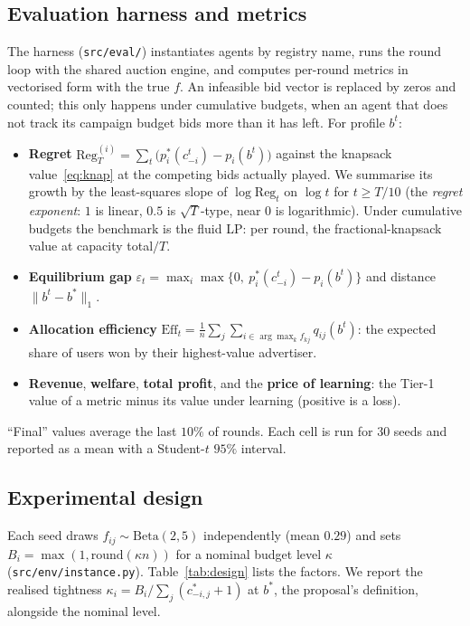 \documentclass{article}
\theoremstyle{definition}
\newcommand{\Reg}{\mathrm{Reg}}
\newcommand{\Eff}{\mathrm{Eff}}
\begin{document}
\subsection{Evaluation harness and metrics}\label{sec:harness}
The harness (\texttt{src/eval/}) instantiates agents by registry name, runs the round loop with the shared
auction engine, and computes per-round metrics in vectorised form with the true $f$. An infeasible bid
vector is replaced by zeros and counted; this only happens under cumulative budgets, when an agent that
does not track its campaign budget bids more than it has left. For profile $b^t$:
\begin{itemize}
  \item \textbf{Regret} $\Reg^{(i)}_T=\sum_t\big(p_i^\ast(c^t_{-i})-p_i(b^t)\big)$ against the
        knapsack value~\eqref{eq:knap} at the competing bids actually played. We summarise its growth by
        the least-squares slope of $\log\Reg_t$ on $\log t$ for $t\ge T/10$ (the \emph{regret exponent}:
        $1$ is linear, $0.5$ is $\sqrt T$-type, near $0$ is logarithmic). Under cumulative budgets the
        benchmark is the fluid LP: per round, the fractional-knapsack value at capacity total$/T$.
  \item \textbf{Equilibrium gap} $\varepsilon_t=\max_i\max\{0,\ p_i^\ast(c^t_{-i})-p_i(b^t)\}$ and
        distance $\|b^t-b^\ast\|_1$.
  \item \textbf{Allocation efficiency} $\Eff_t=\frac1n\sum_j\sum_{i\in\arg\max_k f_{kj}}q_{ij}(b^t)$:
        the expected share of users won by their highest-value advertiser.
  \item \textbf{Revenue}, \textbf{welfare}, \textbf{total profit}, and the \textbf{price of learning}:
        the Tier-1 value of a metric minus its value under learning (positive is a loss).
\end{itemize}
``Final'' values average the last $10\%$ of rounds. Each cell is run for $30$ seeds and reported as a
mean with a Student-$t$ $95\%$ interval.

\subsection{Experimental design}\label{sec:design}
Each seed draws $f_{ij}\sim\mathrm{Beta}(2,5)$ independently (mean $0.29$) and sets
$B_i=\max(1,\mathrm{round}(\kappa n))$ for a nominal budget level $\kappa$
(\texttt{src/env/instance.py}). Table~\ref{tab:design} lists the factors. We report the realised tightness
$\kappa_i=B_i/\sum_j(c^\ast_{-i,j}+1)$ at $b^\ast$, the proposal's definition, alongside the nominal level.
\end{document}

